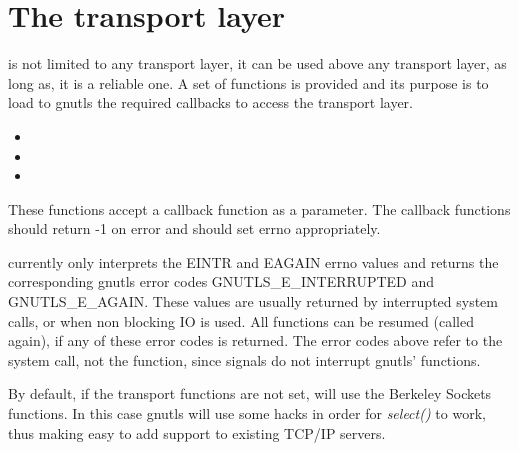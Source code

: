 \section{The transport layer}
\par
\gnutls{} is not limited to any transport layer, it 
can be used above any transport layer, as long as, it is a reliable 
one. A set of functions is provided and its purpose is to load
to gnutls the required callbacks to access the transport layer.

\begin{itemize}
\item {}
\item {}
\item {}
\end{itemize}

These functions accept a callback function as a parameter.
The callback functions should return -1 on error and should set errno 
appropriately.
\par
\gnutls{} currently only interprets the EINTR and EAGAIN errno values and
returns the corresponding gnutls error codes GNUTLS\_E\_INTERRUPTED and
GNUTLS\_E\_AGAIN.
These values are usually returned by interrupted system calls, or 
when non blocking IO is used. All \gnutls{} functions
can be resumed (called again), if any of these error codes is returned.
The error codes above refer to the system call, not the \gnutls{} function,
since signals do not interrupt gnutls' functions.

\par
By default, if the transport functions are not set, \gnutls{} will use
the Berkeley Sockets functions. In this case
gnutls will use some hacks in order for \emph{select()} to work, thus
making easy to add \tls{} support to existing TCP/IP servers.
